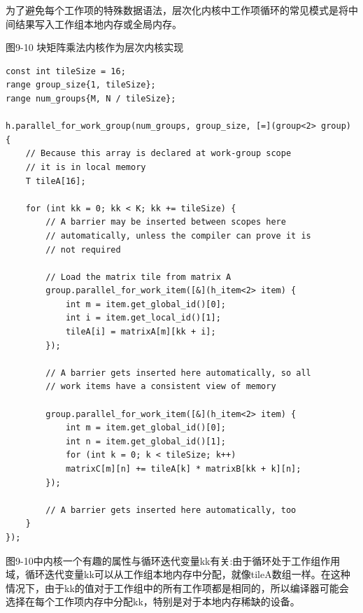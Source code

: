 为了避免每个工作项的特殊数据语法，层次化内核中工作项循环的常见模式是将中间结果写入工作组本地内存或全局内存。\par

\hspace*{\fill} \par %
图9-10 块矩阵乘法内核作为层次内核实现
\begin{lstlisting}[caption={}]
const int tileSize = 16;
range group_size{1, tileSize};
range num_groups{M, N / tileSize};

h.parallel_for_work_group(num_groups, group_size, [=](group<2> group) {
	// Because this array is declared at work-group scope
	// it is in local memory
	T tileA[16];
	
	for (int kk = 0; kk < K; kk += tileSize) {
		// A barrier may be inserted between scopes here
		// automatically, unless the compiler can prove it is
		// not required
		
		// Load the matrix tile from matrix A
		group.parallel_for_work_item([&](h_item<2> item) {
			int m = item.get_global_id()[0];
			int i = item.get_local_id()[1];
			tileA[i] = matrixA[m][kk + i];
		});
	
		// A barrier gets inserted here automatically, so all
		// work items have a consistent view of memory
		
		group.parallel_for_work_item([&](h_item<2> item) {
			int m = item.get_global_id()[0];
			int n = item.get_global_id()[1];
			for (int k = 0; k < tileSize; k++)
			matrixC[m][n] += tileA[k] * matrixB[kk + k][n];
		});
	
		// A barrier gets inserted here automatically, too
	}
});
\end{lstlisting}

图9-10中内核一个有趣的属性与循环迭代变量kk有关:由于循环处于工作组作用域，循环迭代变量kk可以从工作组本地内存中分配，就像tileA数组一样。在这种情况下，由于kk的值对于工作组中的所有工作项都是相同的，所以编译器可能会选择在每个工作项内存中分配kk，特别是对于本地内存稀缺的设备。\par























